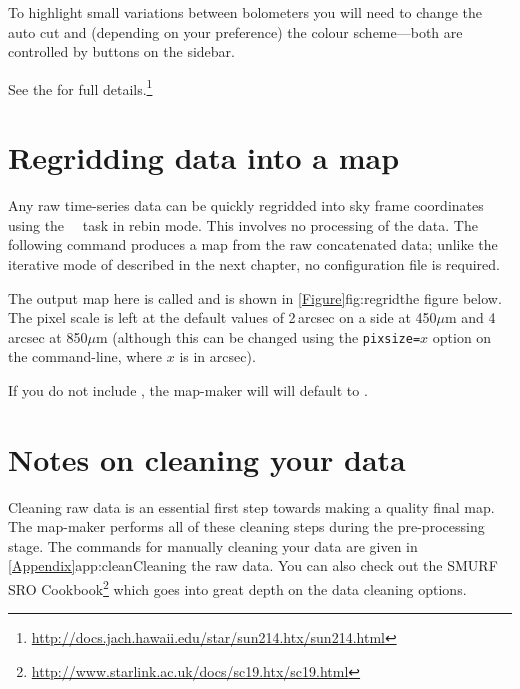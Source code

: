 \documentclass[11pt,oneside,chapters]{starlink}
\begin{document}
To highlight small variations between bolometers you will need to
change the auto cut and (depending on your preference) the colour
scheme---both are controlled by buttons on the sidebar.

See the  for full
details.\footnote{\url{http://docs.jach.hawaii.edu/star/sun214.htx/sun214.html}}


\section{Regridding data into a map}
\label{sec:regrid}

Any raw time-series data can be quickly regridded into sky frame
coordinates using the \smurf\ \makemap\ task in rebin mode. This
involves no processing of the data. The following command produces a
map from the raw concatenated data; unlike the iterative mode of
 described in the next chapter, no configuration file is
required.

\begin{terminalv}
\end{terminalv}

The output map here is called  and is shown in
\cref{Figure}{fig:regrid}{the figure below}.  The pixel scale is left
at the default values of 2\,arcsec on a side at 450$\mu$m and
4\,arcsec at 850$\mu$m (although this can be changed using the
\texttt{pixsize=}$x$ option on the command-line, where $x$ is in
arcsec).


\begin{tip}
  If you do not include , the map-maker will will
  default to .
\end{tip}


\section{Notes on cleaning your data}
\label{sec:clean}

Cleaning raw data is an essential first step towards making a quality
final map. The map-maker performs all of these cleaning steps during
the pre-processing stage. The commands for manually cleaning your data
are given in \cref{Appendix}{app:clean}{Cleaning the raw data}.  You
can also check out the SMURF SRO
Cookbook{\footnote{\url{http://www.starlink.ac.uk/docs/sc19.htx/sc19.html}}}
which goes into great depth on the data cleaning options.
\end{document}
